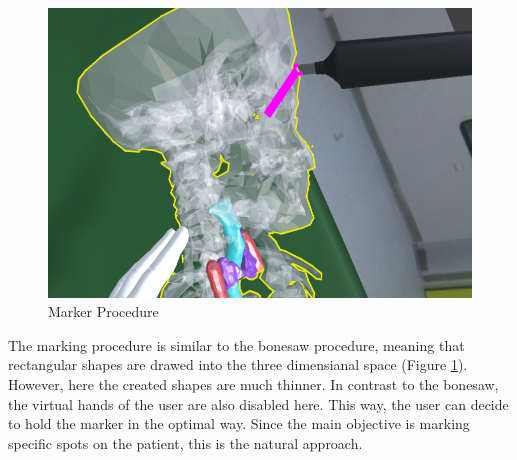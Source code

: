 \begin{figure}[ht!]
    \centering
    \includegraphics[width=\linewidth]{images/implementation/features/procedures/marker.png}
    \caption{\label{fig::FeatureMarker}Marker Procedure}
\end{figure}

The marking procedure is similar to the bonesaw procedure, meaning that rectangular shapes are drawed into the three dimensianal space (Figure \ref{fig::FeatureMarker}).
However, here the created shapes are much thinner.
In contrast to the bonesaw, the virtual hands of the user are also disabled here.
This way, the user can decide to hold the marker in the optimal way.
Since the main objective is marking specific spots on the patient, this is the natural approach.